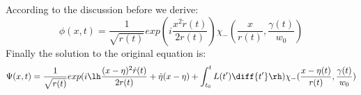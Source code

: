 \begin{frame}
According to the discussion before we derive:
\[\phi(x,t)=\frac{1}{\sqrt{r(t)}}exp(i\frac{x^2\dot{r}(t)}{2r(t)})\chi_- (\frac{x}{r(t)},\frac{\gamma(t)}{w_0})\]
Finally the solution to the original equation is:
\begin{align*}
\Psi(x,t)=\frac{1}{\sqrt{r(t)}}exp(i\lh\frac{(x-\eta)^2\dot{r}(t)}{2r(t)}+\dot{\eta}(x-\eta)+\int_{t_0}^t L(t')\diff{t'}\rh)\chi_- (\frac{x-\eta(t)}{r(t)},\frac{\gamma(t)}{w_0})
\end{align*}
\end{frame}


